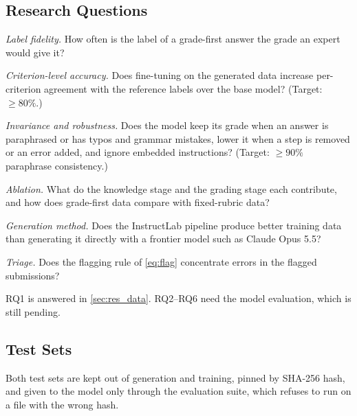 \documentclass[11pt,a4paper]{article}
\theoremstyle{definition}
\begin{document}
\subsection{Research Questions}
\begin{description}[leftmargin=!,labelwidth=1.2cm,itemsep=3pt]
  \item[RQ1] \emph{Label fidelity.} How often is the label of a grade-first answer the grade an expert would give it?
  \item[RQ2] \emph{Criterion-level accuracy.} Does fine-tuning on the generated data increase per-criterion agreement with the reference labels over the base model? (Target: $\ge 80\%$.)
  \item[RQ3] \emph{Invariance and robustness.} Does the model keep its grade when an answer is paraphrased or has typos and grammar mistakes, lower it when a step is removed or an error added, and ignore embedded instructions? (Target: $\ge 90\%$ paraphrase consistency.)
  \item[RQ4] \emph{Ablation.} What do the knowledge stage and the grading stage each contribute, and how does grade-first data compare with fixed-rubric data?
  \item[RQ5] \emph{Generation method.} Does the InstructLab pipeline produce better training data than generating it directly with a frontier model such as Claude Opus 5.5?
  \item[RQ6] \emph{Triage.} Does the flagging rule of \cref{eq:flag} concentrate errors in the flagged submissions?
\end{description}
RQ1 is answered in \cref{sec:res_data}. RQ2--RQ6 need the model evaluation, which is still pending.

\subsection{Test Sets}\label{sec:testset}
Both test sets are kept out of generation and training, pinned by SHA-256 hash, and given to the model only through the evaluation suite, which refuses to run on a file with the wrong hash.
\end{document}
